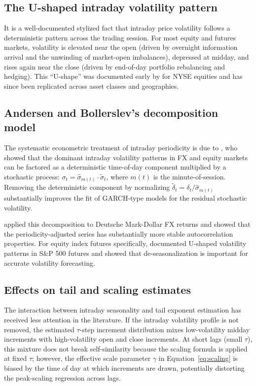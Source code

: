 \documentclass[12pt,a4paper]{article}
\begin{document}
\subsection{The U-shaped intraday volatility pattern}

It is a well-documented stylized fact that intraday price volatility follows a
deterministic pattern across the trading session. For most equity and futures
markets, volatility is elevated near the open (driven by overnight information
arrival and the unwinding of market-open imbalances), depressed at midday, and
rises again near the close (driven by end-of-day portfolio rebalancing and
hedging). This ``U-shape'' was documented early by \textcite{WoodMcInishOrd1985}
for NYSE equities and has since been replicated across asset classes and
geographies.

\subsection{Andersen and Bollerslev's decomposition model}

The systematic econometric treatment of intraday periodicity is due to
\textcite{AndersenBollerslev1997,AndersenBollerslev1998}, who showed that the
dominant intraday volatility patterns in FX and equity markets can be factored
as a deterministic time-of-day component multiplied by a stochastic process:
$\sigma_t = \hat\sigma_{m(t)} \cdot \tilde\sigma_t$, where $m(t)$ is the
minute-of-session. Removing the deterministic component by normalizing
$\tilde\delta_t = \delta_t / \hat\sigma_{m(t)}$ substantially improves the fit
of GARCH-type models for the residual stochastic volatility.

\textcite{AndersenBollerslev1998} applied this decomposition to Deutsche
Mark-Dollar FX returns and showed that the periodicity-adjusted series has
substantially more stable autocorrelation properties. For equity index futures
specifically, \textcite{Ederington1993} documented U-shaped volatility patterns
in S\&P 500 futures and \textcite{Lee1994} showed that de-seasonalization is
important for accurate volatility forecasting.

\subsection{Effects on tail and scaling estimates}

The interaction between intraday seasonality and tail exponent estimation has
received less attention in the literature. If the intraday volatility profile
is not removed, the estimated $\tau$-step increment distribution mixes
low-volatility midday increments with high-volatility open and close increments.
At short lags (small $\tau$), this mixture does not break self-similarity
because the scaling formula is applied at fixed $\tau$; however, the effective
scale parameter $\gamma$ in Equation~\eqref{eq:scaling} is biased by the time
of day at which increments are drawn, potentially distorting the peak-scaling
regression across lags.
\end{document}
